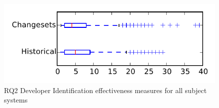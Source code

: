 
\begin{figure}
\centering
\includegraphics[height=0.4\textheight]{figures/dit/rq2_tiny}
\caption{RQ2 Developer Identification effectiveness measures for all subject systems}
\label{fig:dit:rq2:tiny}
\end{figure}
